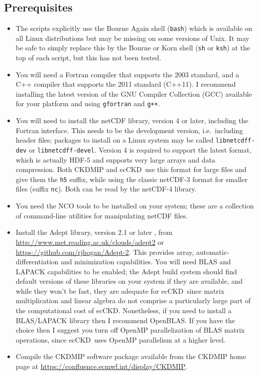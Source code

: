 \documentclass[a4,oneside]{article}
\def\codesize{\small}
\newcommand{\ecckd}{ecCKD}
\def\codesize{\small}
\def\code#1{{\codesize\texttt{#1}}}
\begin{document}
\subsection{Prerequisites}
\begin{itemize}
\item The scripts explicitly use the Bourne Again shell (\code{bash})
  which is available on all Linux distributions but may be missing on
  some versions of Unix. It may be safe to simply replace this by the
  Bourne or Korn shell (\code{sh} or \code{ksh}) at the top of each
  script, but this has not been tested.
\item You will need a Fortran compiler that supports the 2003
  standard, and a C++ compiler that supports the 2011 standard
  (C++11).  I recommend installing the latest version of the GNU
  Compiler Collection (GCC) available for your platform and using
  \code{gfortran} and \code{g++}.
\item You will need to install the netCDF library, version 4 or later,
  including the Fortran interface. This needs to be the development
  version, i.e.\ including header files; packages to install on a
  Linux system may be called \code{libnetcdff-dev} or
  \code{libnetcdff-devel}. Version 4 is required to support the latest
  format, which is actually HDF-5 and supports very large arrays and
  data compression. Both CKDMIP and \ecckd\ use this format for large
  files and give them the \code{h5} suffix, while using the classic
  netCDF-3 format for smaller files (suffix \code{nc}). Both can be
  read by the netCDF-4 library.
\item You need the NCO tools to be installed on your system; these are
  a collection of command-line utilities for manipulating netCDF
  files.
\item Install the Adept library, version 2.1 or later
  \citep{Hogan2014}, from
  \url{http://www.met.reading.ac.uk/clouds/adept2} or
  \url{https://github.com/rjhogan/Adept-2}. This provides array,
  automatic-differentiation and minimization capabilities. You will
  need BLAS and LAPACK capabilities to be enabled; the Adept build
  system should find default versions of these libraries on your
  system if they are available, and while they won't be fast, they are
  adequate for \ecckd\ since matrix multiplication and linear algebra
  do not comprise a particularly large part of the computational cost
  of \ecckd.  Nonetheless, if you need to install a BLAS/LAPACK
  library then I recommend OpenBLAS. If you have the choice then I
  suggest you turn off OpenMP parallelization of BLAS matrix
  operations, since \ecckd\ uses OpenMP parallelism at a higher level.
\item Compile the CKDMIP software package available from the CKDMIP
  home page at \url{https://confluence.ecmwf.int/display/CKDMIP}.
\end{itemize}
\end{document}
